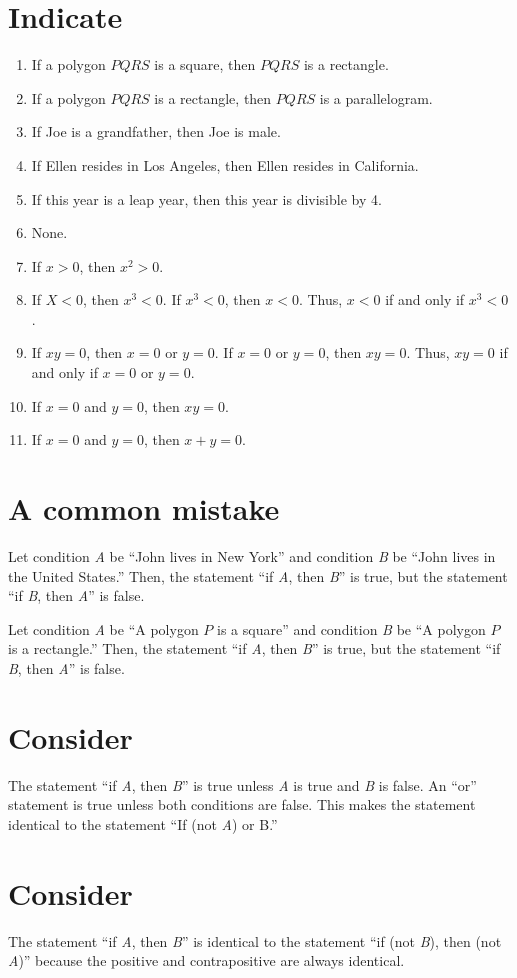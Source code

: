 \documentclass[12pt]{article}
\begin{document}
\section{Indicate}
\begin{enumerate}
    \item If a polygon $PQRS$ is a square, then $PQRS$ is a rectangle.
    \item If a polygon $PQRS$ is a rectangle, then $PQRS$ is a parallelogram.
    \item If Joe is a grandfather, then Joe is male.
    \item If Ellen resides in Los Angeles, then Ellen resides in California.
    \item If this year is a leap year, then this year is divisible by 4.
    \item None.
    \item If $x>0$, then $x^2>0$.
    \item If $X<0$, then $x^3<0$. If $x^3<0$, then $x<0$. Thus, $x<0$ if and only if $x^3<0$.
    \item If $xy=0$, then $x=0$ or $y=0$. If $x=0$ or $y=0$, then $xy=0$. Thus, $xy=0$ if and only if $x=0$ or $y=0$.
    \item If $x=0$ and $y=0$, then $xy=0$.
    \item If $x=0$ and $y=0$, then $x+y=0$.
\end{enumerate}
\section{A common mistake}
Let condition \textit{A} be ``John lives in New York'' and condition \textit{B} be ``John lives in the United States.'' Then, the statement ``if \textit{A}, then \textit{B}'' is true, but the statement ``if \textit{B}, then \textit{A}'' is false.

Let condition \textit{A} be ``A polygon $P$ is a square'' and condition \textit{B} be ``A polygon $P$ is a rectangle.'' Then, the statement ``if \textit{A}, then \textit{B}'' is true, but the statement ``if \textit{B}, then \textit{A}'' is false.
\section{Consider}
The statement ``if \textit{A}, then \textit{B}'' is true unless \textit{A} is true and \textit{B} is false. An ``or'' statement is true unless both conditions are false. This makes the statement identical to the statement ``If (not \textit{A}) or B.''
\section{Consider}
The statement ``if \textit{A}, then \textit{B}'' is identical to the statement ``if (not \textit{B}), then (not \textit{A})'' because the positive and contrapositive are always identical.
\end{document}
